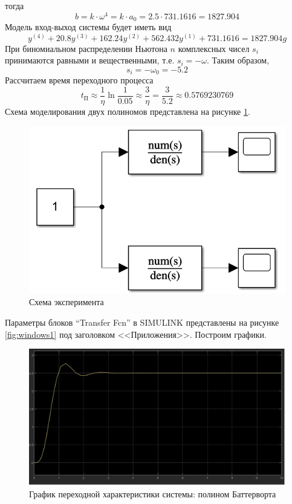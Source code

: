 \documentclass[a4paper, 12pt]{article}
\begin{document}
    тогда $$b=k\cdot\omega^4=k\cdot a_0=2.5\cdot731.1616=1827.904$$
    Модель вход-выход системы будет иметь вид
    $$
    y^{(4)}+20.8y^{(3)}+162.24y^{(2)}+562.432y^{(1)}+731.1616=1827.904g
    $$
    При биномиальном распределении Ньютона $n$ комплексных чисел $s_i$ принимаются
    равными и вещественными, т.е. $s_i=-\omega$. Таким образом, $$s_i=-\omega_0=-5.2$$
    Рассчитаем время переходного процесса
    $$t_{\text{П}}\approx\dfrac{1}{\eta}\ln{\dfrac{1}{0.05}}\approx\dfrac{3}{\eta}=\dfrac{3}{5.2}\approx0.5769230769$$
    Схема моделирования двух полиномов представлена на рисунке \ref{fig:scheme1}.
    \begin{figure}[H]
        \centering
        \includegraphics[scale=0.6]{scheme1.png}
        \captionsetup{skip=0pt}
        \caption{Схема эксперимента}
        \label{fig:scheme1}
    \end{figure}
    \noindent Параметры блоков ``Transfer Fcn'' в SIMULINK
    представлены на рисунке \ref{fig:windows1} под заголовком <<Приложения>>. Построим графики.
    \begin{figure}[H]
        \centering
        \includegraphics[scale=0.3]{task_1_baterwort.jpg}
        \captionsetup{skip=0pt}
        \caption{График переходной характеристики системы: полином Баттерворта}
        \label{fig:t1bat}
    \end{figure}
\end{document}
